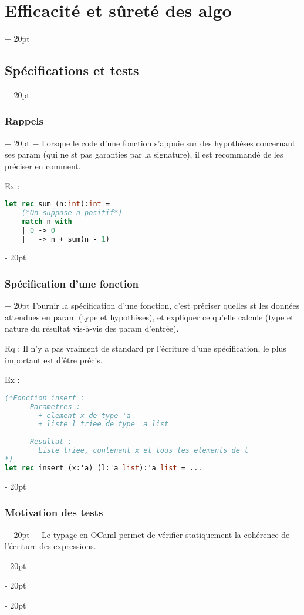 \documentclass[a4paper, 12pt, twoside]{article}
\newcommand{\ind}[1][20pt]{\advance\leftskip + #1}
\newcommand{\deind}[1][20pt]{\advance\leftskip - #1}
\newenvironment{indentedenv}[1][20pt]{\par \ind[#1]}{\par \deind}
\newenvironment{indt}[2][20pt]{#2 \begin{indentedenv}[#1]}{\end{indentedenv}} %
\begin{document}
\begin{indt}{\section{Efficacité et sûreté des algo}}
\begin{indt}{\subsection{Spécifications et tests}}
\begin{indt}{\subsubsection{Rappels}}
                $-$ Lorsque le code d'une fonction s'appuie sur des hypothèses concernant ses param (qui ne st pas garanties par la signature), il est recommandé de les préciser en comment.
                
                Ex :
                \begin{lstlisting}[language=Caml, xleftmargin=80pt]
let rec sum (n:int):int =
    (*On suppose n positif*)
    match n with
    | 0 -> 0
    | _ -> n + sum(n - 1)
                \end{lstlisting}
            \end{indt}
            
            \begin{indt}{\subsubsection{Spécification d'une fonction}}
                Fournir la spécification d'une fonction, c'est préciser quelles st les données attendues en param (type et hypothèses), et expliquer ce qu'elle calcule (type et nature du résultat vis-à-vis des param d'entrée).
                
                Rq : Il n'y a pas vraiment de standard pr l'écriture d'une spécification, le plus important est d'être précis.
                
                Ex :
                \begin{lstlisting}[language=Caml, xleftmargin=80pt]
(*Fonction insert :
    - Parametres :
        + element x de type 'a
        + liste l triee de type 'a list
    
    - Resultat :
        Liste triee, contenant x et tous les elements de l
*)
let rec insert (x:'a) (l:'a list):'a list = ...
                \end{lstlisting}

            \end{indt}
            
            \vspace{6pt}
            
            \begin{indt}{\subsubsection{Motivation des tests}}
                $-$ Le typage en OCaml permet de vérifier statiquement la cohérence de l'écriture des expressions.
                

\end{indt}
\end{indt}
\end{indt}
\end{document}

